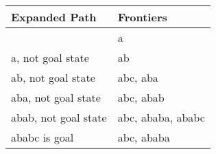 \documentclass{article}
\begin{document}
\begin{enumerate}
{\begin{table}[H]
\centering
\begin{tabular}{|l|l|}
	\hline
	Expanded Path & Frontiers\\
	\hline\hline
	& a\\
	\hline
	a, not goal state & ab\\
	\hline
	ab, not goal state & abc, aba\\
	\hline
	aba, not goal state & abc, abab\\
	\hline
	abab, not goal state & abc, ababa, ababc\\
	\hline
	ababc is goal & abc, ababa\\
	\hline
\end{tabular}
\caption{}\label{long}
\end{table}}
\end{enumerate}
\end{document}
